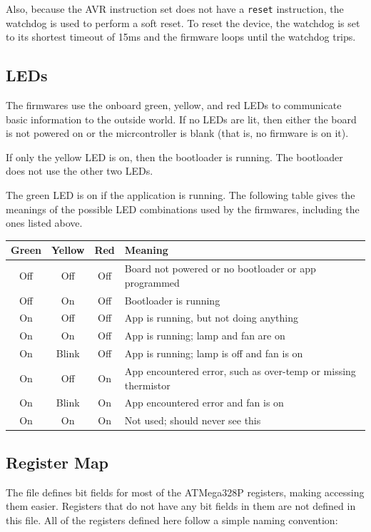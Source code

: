 \documentclass{article}
\begin{document}
Also, because the AVR instruction set does not have a \texttt{reset} instruction, the watchdog is
used to perform a soft reset.  To reset the device, the watchdog is set to its shortest timeout of
15ms and the firmware loops until the watchdog trips.

\subsection{LEDs} \label{ssec:FWLEDs}
The firmwares use the onboard green, yellow, and red LEDs to communicate basic information to the
outside world.  If no LEDs are lit, then either the board is not powered on or the micrcontroller is
blank (that is, no firmware is on it).

If only the yellow LED is on, then the bootloader is running.  The bootloader does not use the other
two LEDs.

The green LED is on if the application is running.  The following table gives the meanings of the
possible LED combinations used by the firmwares, including the ones listed above.

\begin{center}
    \begin{tabular}{c|c|c|p{}}
        Green & Yellow & Red & Meaning \\
        \hline
        Off & Off & Off & Board not powered or no bootloader or app programmed \\
        Off & On & Off & Bootloader is running \\
        On & Off & Off & App is running, but not doing anything \\
        On & On & Off & App is running; lamp and fan are on \\
        On & Blink & Off & App is running; lamp is off and fan is on \\
        On & Off & On & App encountered error, such as over-temp or missing thermistor \\
        On & Blink & On & App encountered error and fan is on \\
        On & On & On & Not used; should never see this \\
    \end{tabular}
\end{center}

\subsection{Register Map} \label{ssec:FWRegMap}
The file  defines bit fields for most of the ATMega328P registers,
making accessing them easier.  Registers that do not have any bit fields in them are not defined in
this file.  All of the registers defined here follow a simple naming convention:
\end{document}
